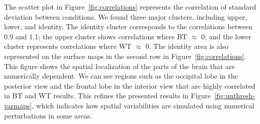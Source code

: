 \documentclass[runningheads]{llncs}
\begin{document}
The scatter plot in Figure~\ref{fig:correlations} represents the correlation of standard deviation between conditions.
We found three major clusters, including upper, lower, and identity.
The identity cluster corresponds to the correlations between 0.9 and 1.1; the upper cluster shows correlations where BT $\approx$ 0;
and the lower cluster represents correlations where WT $\approx$ 0.
The identity area is also represented on the surface maps in the second row in Figure~\ref{fig:correlations}.
This figure shows the spatial localization of the parts of the brain that are numerically dependent.
We can see regions such as the occipital lobe in the posterior view and the frontal lobe in the interior view 
that are highly correlated in BT and WT results.
This refines the presented results in Figure~\ref{fig:unthresh-varmaps},
which indicates how spatial variabilities are simulated using numerical perturbations in some areas.
\end{document}
